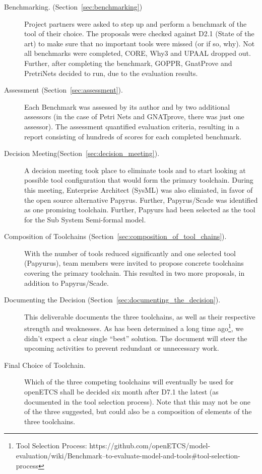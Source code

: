 \begin{description}

\item[Benchmarking. (Section~\ref{sec:benchmarking})] Project partners were asked to step up and perform a benchmark of the tool of their choice.  The proposals were checked against D2.1 (State of the art) to make sure that no important tools were missed (or if so, why).  Not all benchmarks were completed, CORE, Why3 and UPAAL dropped out.  Further, after completing the benchmark, GOPPR, GnatProve and PretriNets decided to run, due to the evaluation results.

\item[Assessment (Section~\ref{sec:assessment}).] Each Benchmark was assessed by its author and by two additional assessors (in the case of Petri Nets and GNATprove, there was just one assessor).  The assessment quantified evaluation criteria, resulting in a report consisting of hundreds of scores for each completed benchmark.

\item[Decision Meeting(Section~\ref{sec:decision_meeting}).] A decision meeting took place to eliminate tools and to start looking at possible tool configuration that would form the primary toolchain.  During this meeting, Enterprise Architect (SysML) was also elimiated, in favor of the open source alternative Papyrus.  Further, Papyrus/Scade was identified as one promising toolchain.  Further, Papyurs had been selected as the tool for the Sub System Semi-formal model.

\item[Composition of Toolchains (Section~\ref{sec:composition_of_tool_chains}).] With the number of tools reduced significantly and one selected tool (Papyurus), team members were invited to propose concrete toolchains covering the primary toolchain.  This resulted in two more proposals, in addition to Papyrus/Scade.

\item[Documenting the Decision (Section~\ref{sec:documenting_the_decision}).] This deliverable documents the three toolchains, as well as their respective strength and weaknesses.  As has been determined a long time ago\footnote{Tool Selection Process: https://github.com/openETCS/model-evaluation/wiki/Benchmark--to-evaluate-model-and-tools\#tool-selection-process}, we didn't expect a clear single ``best'' solution.  The document will steer the upcoming activities to prevent redundant or unnecessary work.

\item[Final Choice of Toolchain.] Which of the three competing toolchains will eventually be used for openETCS shall be decided six month after D7.1 the latest (as documented in the tool selection process).  Note that this may not be one of the three suggested, but could also be a composition of elements of the three toolchains.

\end{description}

